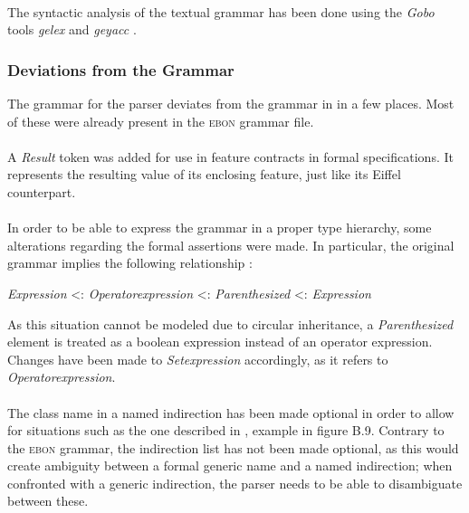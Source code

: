 \paragraph{} The syntactic analysis of the textual \bon{} grammar has been done using the \textit{Gobo} tools \textit{gelex} and \textit{geyacc} \cite{gobo}.
\subsubsection{Deviations from the Grammar}
\label{design-grammar-deviations}
The grammar for the parser deviates from the grammar in \cite{walden1995} in a few places. Most of these were already present in the \textsc{ebon} grammar file.
\paragraph{} A \textit{Result} token was added for use in feature contracts in formal specifications. It represents the resulting value of its enclosing feature, just like its Eiffel counterpart.
\paragraph{} In order to be able to express the grammar in a proper type hierarchy, some alterations regarding the formal assertions were made. In particular, the original grammar implies the following relationship \cite[p.~357]{walden1995}:
\begin{center}
\textit{Expression} \textless : \textit{Operator\textunderscore expression} \textless : \textit{Parenthesized} \textless : \textit{Expression}
\end{center}
As this situation cannot be modeled due to circular inheritance, a \textit{Parenthesized} element is treated as a boolean expression instead of an operator expression. Changes have been made to \textit{Set\textunderscore expression} accordingly, as it refers to \textit{Operator\textunderscore expression}.
\paragraph{} The class name in a named indirection has been made optional in order to allow for situations such as the one described in \cite[p.~372]{walden1995}, example in figure B.9. Contrary to the \textsc{ebon} grammar, the indirection list has not been made optional, as this would create ambiguity between a formal generic name and a named indirection; when confronted with a generic indirection, the parser needs to be able to disambiguate between these.

